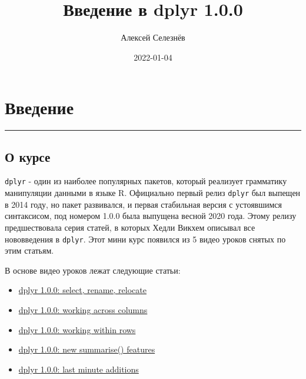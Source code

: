 \documentclass[
]{book}
\title{Введение в dplyr 1.0.0}
\author{Алексей Селезнёв}
\date{2022-01-04}
\providecommand{\tightlist}{%
  \setlength{\itemsep}{0pt}\setlength{\parskip}{0pt}}
\begin{document}
\maketitle

{
\setcounter{tocdepth}{1}
\tableofcontents
}
\hypertarget{ux432ux432ux435ux434ux435ux43dux438ux435}{%
\chapter*{Введение}\label{ux432ux432ux435ux434ux435ux43dux438ux435}}

\begin{center}\rule{0.5\linewidth}{0.5pt}\end{center}

\hypertarget{ux43e-ux43aux443ux440ux441ux435}{%
\section*{О курсе}\label{ux43e-ux43aux443ux440ux441ux435}}

\texttt{dplyr} - один из наиболее популярных пакетов, который реализует грамматику манипуляции данными в языке R. Официально первый релиз \texttt{dplyr} был выпещен в 2014 году, но пакет развивался, и первая стабильная версия с устоявшимся синтаксисом, под номером 1.0.0 была выпущена весной 2020 года. Этому релизу предшествовала серия статей, в которых Хедли Викхем описывал все нововведения в \texttt{dplyr}. Этот мини курс появился из 5 видео уроков снятых по этим статьям.

В основе видео уроков лежат следующие статьи:

\begin{itemize}
\tightlist
\item
  \href{https://www.tidyverse.org/blog/2020/03/dplyr-1-0-0-select-rename-relocate/}{dplyr 1.0.0: select, rename, relocate}
\item
  \href{https://www.tidyverse.org/blog/2020/04/dplyr-1-0-0-colwise/}{dplyr 1.0.0: working across columns}
\item
  \href{https://www.tidyverse.org/blog/2020/04/dplyr-1-0-0-rowwise/}{dplyr 1.0.0: working within rows}
\item
  \href{https://www.tidyverse.org/blog/2020/03/dplyr-1-0-0-summarise/}{dplyr 1.0.0: new summarise() features}
\item
  \href{https://www.tidyverse.org/blog/2020/05/dplyr-1-0-0-last-minute-additions/}{dplyr 1.0.0: last minute additions}
\end{itemize}
\end{document}
